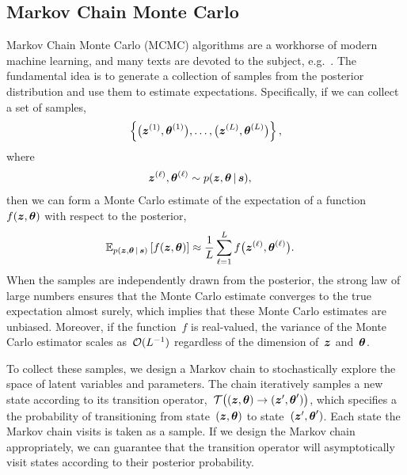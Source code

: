 \subsection{Markov Chain Monte Carlo}
Markov Chain Monte Carlo (MCMC) algorithms are a workhorse of modern
machine learning, and many texts are devoted to the subject,
e.g.~\citet{geyer1992practical, gilks2005markov, robert2013monte}.  The
fundamental idea is to generate a collection of samples from the
posterior distribution and use them to estimate expectations.
Specifically, if we can collect a set of
samples,
\begin{align*}
  \left \{ \big(\boldsymbol{z}^{(1)}, \boldsymbol{\theta}^{(1)} \big), 
           \ldots, 
           \big(\boldsymbol{z}^{(L)}, \boldsymbol{\theta}^{(L)} \big) 
  \right\},
\end{align*}
where
\begin{align*}
  \boldsymbol{z}^{(\ell)}, \boldsymbol{\theta}^{(\ell)} &\sim p(\boldsymbol{z}, \boldsymbol{\theta} \,|\, \boldsymbol{s}),
\end{align*}
then we can form a Monte Carlo estimate of the expectation of a function~$f(\boldsymbol{z}, \boldsymbol{\theta})$
with respect to the posterior,
\begin{align*}
  \mathbb{E}_{p(\boldsymbol{z}, \boldsymbol{\theta} \,|\, \boldsymbol{s})} \left[ f(\boldsymbol{z}, \boldsymbol{\theta}) \right] 
  &\approx \frac{1}{L} \sum_{\ell = 1}^L f \big(\boldsymbol{z}^{(\ell)}, \boldsymbol{\theta}^{(\ell)} \big).
\end{align*}
When the samples are independently drawn from the posterior, the strong 
law of large numbers ensures that the Monte Carlo estimate converges to 
the true expectation almost surely, which implies that these Monte Carlo
estimates are unbiased. Moreover, if the function~$f$ is real-valued, 
the variance of the Monte Carlo estimator scales as~$\mathcal{O}(L^{-1})$
regardless of the dimension of~$\boldsymbol{z}$ and~$\boldsymbol{\theta}$.


To collect these samples, we design a Markov chain to stochastically
explore the space of latent variables and parameters.  
The chain iteratively samples a new state according to its transition
operator,~${\mathcal{T} \big((\boldsymbol{z}, \boldsymbol{\theta}) \to (\boldsymbol{z}', \boldsymbol{\theta}') \big)}$,
which specifies a the probability of transitioning from state~${(\boldsymbol{z},
  \boldsymbol{\theta})}$ to state~${(\boldsymbol{z}', \boldsymbol{\theta}')}$.  Each state the Markov
chain visits is taken as a sample. If we design the Markov chain
appropriately, we can guarantee that the transition operator will
asymptotically visit states according to their posterior probability.

